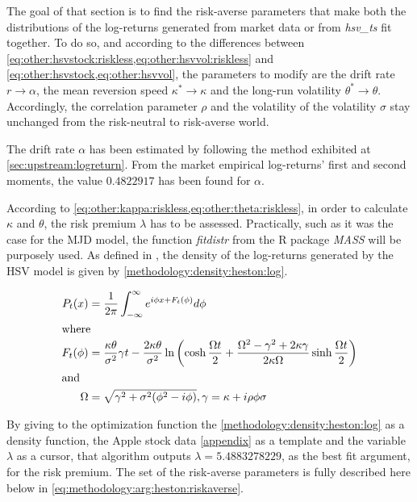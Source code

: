 \documentclass[a4paper, 12pt]{report}
\begin{document}
The goal of that section is to find the risk-averse parameters that make both the distributions of the log-returns generated from market data or from \textit{hsv\_ts} fit together.
To do so, and according to the differences between \cref{eq:other:hsvstock:riskless,eq:other:hsvvol:riskless} and \cref{eq:other:hsvstock,eq:other:hsvvol}, the parameters to modify are the drift rate $r \to \alpha$, the mean reversion speed $\kappa^{*} \to \kappa$ and the long-run volatility $\theta^* \to \theta$.
Accordingly, the correlation parameter $\rho$ and the volatility of the volatility $\sigma$ stay unchanged from the risk-neutral to risk-averse world.

The drift rate $\alpha$ has been estimated by following the method exhibited at \cref{sec:upstream:logreturn}. From the market empirical log-returns' first and second moments, the value $0.4822917$ has been found for $\alpha$.

According to \cref{eq:other:kappa:riskless,eq:other:theta:riskless}, in order to  calculate $\kappa$ and $\theta$, the risk premium $\lambda$ has to be assessed.
Practically, such as it was the case for the MJD model, the function \textit{fitdistr} from the R package \textit{MASS} will be purposely used. 
As defined in \citet{Adrian}, the density of the log-returns generated by the HSV model is given by \cref{methodology:density:heston:log}.

\begin{align}
P_t(x) &= \frac{1}{2 \pi} \int_{-\infty}^{\infty} e^{i \phi x + F_t(\phi)} d\phi \label{methodology:density:heston:log} \\
\intertext{where}
F_t(\phi) &= \frac{\kappa \theta}{\sigma^2} \gamma t -
  \frac{2 \kappa \theta}{\sigma ^2} \ln\left(
    \cosh \frac{\Omega t}{2} +
    \frac{\Omega^2 - \gamma^2 +2 \kappa \gamma}{2 \kappa \Omega} \sinh \frac{\Omega t}{2}
  \right) \notag \\
\intertext{and}
\Omega &= \sqrt{\gamma^2 + \sigma^2 (\phi^2 - i\phi)}, \notag
\gamma = \kappa + i \rho \phi \sigma \notag
\end{align}

By giving to the optimization function the \cref{methodology:density:heston:log} as a density function, the Apple stock data \cref{appendix} as a template and the variable $\lambda$ as a cursor, that algorithm outputs $\lambda = 5.4883278229$, as the best fit argument, for the risk premium.
The set of the risk-averse parameters is fully described here below in \ref{eq:methodology:arg:heston:riskaverse}.
\end{document}

